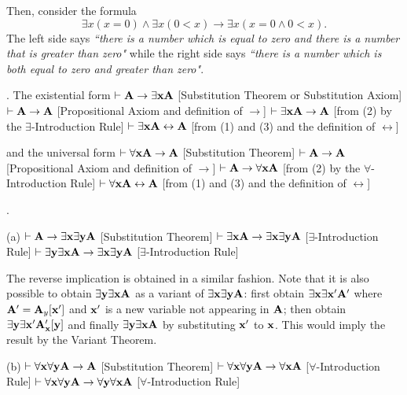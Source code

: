 Then, consider the formula
$$
\exists x (x=0) \land \exists x (0 < x) \to \exists x (x=0 \land 0 < x).
$$
The left side says {\it ``there is a number which is equal to zero and there is 
a number that is greater than zero"} while the right side says {\it ``there is a number
which is both equal to zero and greater than zero"}.


\medskip

. The existential form
 $\vdash {\bf A} \to \exists{\bf x}{\bf A}$ \hfill [Substitution Theorem or Substitution Axiom]
 $\vdash {\bf A} \to {\bf A}$ \hfill [Propositional Axiom and definition of $\to$]
 $\vdash \exists{\bf x}{\bf A} \to {\bf A}$ \hfill [from (2) by the $\exists$-Introduction Rule]
 $\vdash \exists{\bf x}{\bf A} \leftrightarrow {\bf A}$ \hfill [from (1) and (3) and the definition of $\leftrightarrow$]

\noindent and the universal form
 $\vdash \forall{\bf x}{\bf A} \to {\bf A}$ \hfill [Substitution Theorem]
 $\vdash {\bf A} \to {\bf A}$ \hfill [Propositional Axiom and definition of $\to$]
 $\vdash {\bf A} \to \forall{\bf x}{\bf A}$ \hfill [from (2) by the $\forall$-Introduction Rule]
 $\vdash \forall{\bf x}{\bf A} \leftrightarrow {\bf A}$ \hfill [from (1) and (3) and the definition of $\leftrightarrow$]

\medskip

. 

\ansitem (a) 
\itemitem{} $\vdash {\bf A} \to \exists{\bf x}\exists{\bf y}{\bf A}$ \hfill [Substitution Theorem]
\itemitem{} $\vdash \exists{\bf x}{\bf A} \to \exists{\bf x}\exists{\bf y}{\bf A}$ \hfill [$\exists$-Introduction Rule]
\itemitem{} $\vdash \exists{\bf y}\exists{\bf x}{\bf A} \to \exists{\bf x}\exists{\bf y}{\bf A}$ \hfill [$\exists$-Introduction Rule]

The reverse implication is obtained in a similar fashion. Note that it is also possible to obtain 
$\exists{\bf y}\exists{\bf x}{\bf A}$ as a variant of $\exists{\bf x}\exists{\bf y}{\bf A}$: first obtain $\exists{\bf x}\exists{\bf x}'{\bf A}'$
where ${\bf A}'={\bf A}_y[{\bf x}']$ and ${\bf x}'$ is a new variable not appearing in ${\bf A}$; then obtain $\exists{\bf y}\exists{\bf x}'{\bf A}'_{\bf x}[{\bf y}]$ 
and finally $\exists{\bf y}\exists{\bf x}{\bf A}$ by substituting ${\bf x}'$ to ${\bf x}$. This would imply the result by the
Variant Theorem.

\ansitem (b)
\itemitem{} $\vdash \forall{\bf x}\forall{\bf y}{\bf A} \to {\bf A}$ \hfill [Substitution Theorem]
\itemitem{} $\vdash \forall{\bf x}\forall{\bf y}{\bf A} \to \forall{\bf x}{\bf A}$ \hfill [$\forall$-Introduction Rule]
\itemitem{} $\vdash \forall{\bf x}\forall{\bf y}{\bf A} \to \forall{\bf y}\forall{\bf x}{\bf A}$ \hfill [$\forall$-Introduction Rule]

